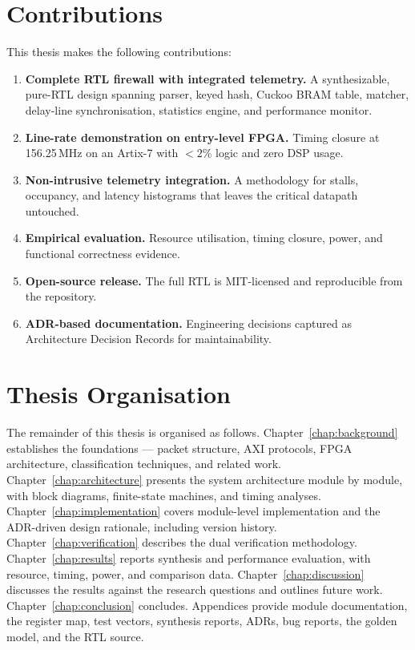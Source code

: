 \documentclass[12pt,twoside,openright]{book}
\begin{document}
\section{Contributions}

This thesis makes the following contributions:

\begin{enumerate}[itemsep=3pt]
  \item \textbf{Complete RTL firewall with integrated telemetry.} A synthesizable, pure-RTL design
        spanning parser, keyed hash, Cuckoo BRAM table, matcher, delay-line synchronisation,
        statistics engine, and performance monitor.
  \item \textbf{Line-rate demonstration on entry-level FPGA.} Timing closure at 156.25\,MHz on an
        Artix-7 with $<2$\% logic and zero DSP usage.
  \item \textbf{Non-intrusive telemetry integration.} A methodology for stalls, occupancy, and
        latency histograms that leaves the critical datapath untouched.
  \item \textbf{Empirical evaluation.} Resource utilisation, timing closure, power, and functional
        correctness evidence.
  \item \textbf{Open-source release.} The full RTL is MIT-licensed and reproducible from the
        repository.
  \item \textbf{ADR-based documentation.} Engineering decisions captured as Architecture Decision
        Records for maintainability.
\end{enumerate}

\section{Thesis Organisation}

The remainder of this thesis is organised as follows. Chapter~\ref{chap:background} establishes the
foundations --- packet structure, AXI protocols, FPGA architecture, classification techniques, and
related work. Chapter~\ref{chap:architecture} presents the system architecture module by module,
with block diagrams, finite-state machines, and timing analyses.
Chapter~\ref{chap:implementation} covers module-level implementation and the ADR-driven design
rationale, including version history. Chapter~\ref{chap:verification} describes the dual
verification methodology. Chapter~\ref{chap:results} reports synthesis and performance evaluation,
with resource, timing, power, and comparison data. Chapter~\ref{chap:discussion} discusses the
results against the research questions and outlines future work.
Chapter~\ref{chap:conclusion} concludes. Appendices provide module documentation, the register map,
test vectors, synthesis reports, ADRs, bug reports, the golden model, and the RTL source.
\end{document}
